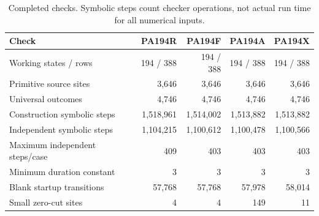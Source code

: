 \begin{table}[ht]
\centering\small
\setlength{\tabcolsep}{5pt}
\begin{tabular}{@{}lrrrr@{}}
\toprule
Check & PA194R & PA194F & PA194A & PA194X\\
\midrule
Working states / rows & 194 / 388 & 194 / 388 & 194 / 388 & 194 / 388\\
Primitive source sites & 3,646 & 3,646 & 3,646 & 3,646\\
Universal outcomes & 4,746 & 4,746 & 4,746 & 4,746\\
Construction symbolic steps & 1,518,961 & 1,514,002 & 1,513,882 & 1,513,882\\
Independent symbolic steps & 1,104,215 & 1,100,612 & 1,100,478 & 1,100,566\\
Maximum independent steps/case & 409 & 403 & 403 & 403\\
Minimum duration constant & 3 & 3 & 3 & 3\\
Blank startup transitions & 57,768 & 57,768 & 57,978 & 58,014\\
Small zero-cut sites & 4 & 4 & 149 & 11\\
\bottomrule
\end{tabular}
\caption{Completed checks. Symbolic steps count checker operations, not actual run time for all numerical inputs.}
\end{table}
